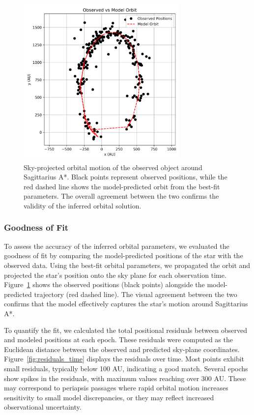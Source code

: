\documentclass[linenumbers,trackchanges,astrosymb,]{aastex7}
\begin{document}
\begin{figure}[ht!]
\centering
\includegraphics[width=0.75\textwidth]{orbit_trace.png}
\caption{
Sky-projected orbital motion of the observed object around Sagittarius A*. Black points represent observed positions, while the red dashed line shows the model-predicted orbit from the best-fit parameters. The overall agreement between the two confirms the validity of the inferred orbital solution.
}
\label{fig:orbit_trace}
\end{figure}


\subsubsection{Goodness of Fit}
To assess the accuracy of the inferred orbital parameters, we evaluated the goodness of fit by comparing the model-predicted positions of the star with the observed data. Using the best-fit orbital parameters, we propagated the orbit and projected the star’s position onto the sky plane for each observation time. Figure~\ref{fig:orbit_trace} shows the observed positions (black points) alongside the model-predicted trajectory (red dashed line). The visual agreement between the two confirms that the model effectively captures the star’s motion around Sagittarius A*.

To quantify the fit, we calculated the total positional residuals between observed and modeled positions at each epoch. These residuals were computed as the Euclidean distance between the observed and predicted sky-plane coordinates. Figure~\ref{fig:residuals_time} displays the residuals over time. Most points exhibit small residuals, typically below 100 AU, indicating a good match. Several epochs show spikes in the residuals, with maximum values reaching over 300 AU. These may correspond to periapsis passages where rapid orbital motion increases sensitivity to small model discrepancies, or they may reflect increased observational uncertainty.
\end{document}
